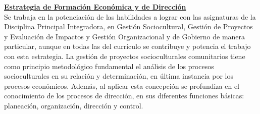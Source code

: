\underline{\textbf{Estrategia de Formación Económica y de Dirección}}\\
Se trabaja en la potenciación de las habilidades a lograr con las asignaturas de la Disciplina Principal Integradora, en Gestión Sociocultural, Gestión de Proyectos y Evaluación de Impactos y Gestión Organizacional y de Gobierno de manera particular, aunque en todas las del currículo se contribuye y potencia el trabajo con esta estrategia. La gestión de proyectos socioculturales comunitarios tiene como principio metodológico fundamental el análisis de los procesos socioculturales en su relación y determinación, en última instancia por los procesos económicos. Además, al aplicar esta concepción se profundiza en el conocimiento de los procesos de dirección, en sus diferentes funciones básicas: planeación, organización, dirección y control.\\

